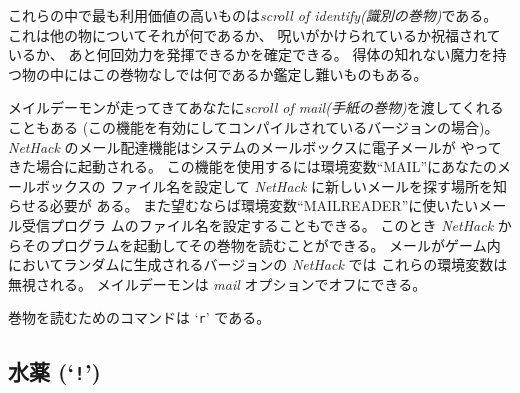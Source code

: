 これらの中で最も利用価値の高いものは{\it scroll of identify(識別の巻物)}である。
これは他の物についてそれが何であるか、
呪いがかけられているか祝福されているか、
あと何回効力を発揮できるかを確定できる。
得体の知れない魔力を持つ物の中にはこの巻物なしでは何であるか鑑定し難いものもある。

メイルデーモンが走ってきてあなたに{\it scroll of mail(手紙の巻物)}を渡してくれることもある
(この機能を有効にしてコンパイルされているバージョンの場合)。
{\it NetHack\/} のメール配達機能はシステムのメールボックスに電子メールが
やってきた場合に起動される。
この機能を使用するには環境変数``MAIL''にあなたのメールボックスの
ファイル名を設定して {\it NetHack\/} に新しいメールを探す場所を知らせる必要が
ある。
また望むならば環境変数``MAILREADER''に使いたいメール受信プログラ
ムのファイル名を設定することもできる。
このとき {\it NetHack\/} からそのプログラムを起動してその巻物を読むことができる。
メールがゲーム内においてランダムに生成されるバージョンの {\it NetHack\/} では
これらの環境変数は無視される。
メイルデーモンは
{\it mail\/}
オプションでオフにできる。

巻物を読むためのコマンドは `{\tt r}' である。

\subsection*{水薬 (`{\tt !}')}

